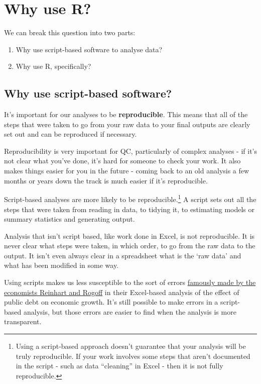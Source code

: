 \documentclass[]{book}
\providecommand{\tightlist}{%
  \setlength{\itemsep}{0pt}\setlength{\parskip}{0pt}}
\let\rmarkdownfootnote\footnote%
\def\footnote{\protect\rmarkdownfootnote}
\begin{document}
\hypertarget{why-use-r}{%
\chapter{Why use R?}\label{why-use-r}}

We can break this question into two parts:

\begin{enumerate}
\def\labelenumi{\arabic{enumi}.}
\tightlist
\item
  Why use script-based software to analyse data?
\item
  Why use R, specifically?
\end{enumerate}

\hypertarget{why-script}{%
\section{Why use script-based software?}\label{why-script}}

It's important for our analyses to be \textbf{reproducible}. This means that all of the steps that were taken to go from your raw data to your final outputs are clearly set out and can be reproduced if necessary.

Reproducibility is very important for QC, particularly of complex analyses - if it's not clear what you've done, it's hard for someone to check your work. It also makes things easier for you in the future - coming back to an old analysis a few months or years down the track is much easier if it's reproducible.

Script-based analyses are more likely to be reproducible.\footnote{Using a script-based approach doesn't guarantee that your analysis will be truly reproducible. If your work involves some steps that aren't documented in the script - such as data ``cleaning'' in Excel - then it is not fully reproducible.} A script sets out all the steps that were taken from reading in data, to tidying it, to estimating models or summary statistics and generating output.

Analysis that isn't script based, like work done in Excel, is not reproducible. It is never clear what steps were taken, in which order, to go from the raw data to the output. It isn't even always clear in a spreadsheet what is the `raw data' and what has been modified in some way.

Using scripts makes us less susceptible to the sort of errors \href{https://en.wikipedia.org/wiki/Growth_in_a_Time_of_Debt\#Methodological_flaws}{famously made by the economists Reinhart and Rogoff} in their Excel-based analysis of the effect of public debt on economic growth. It's still possible to make errors in a script-based analysis, but those errors are easier to find when the analysis is more transparent.
\end{document}
